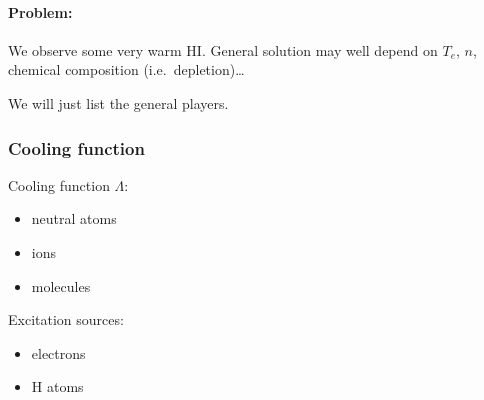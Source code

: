 \documentclass[12pt]{article}
\begin{document}
\paragraph{Problem:}
We observe some very warm HI. General solution may well depend on
$T_{e}$, $n$, chemical composition (i.e.\ depletion)\ldots

We will just list the general players.

\subsubsection{Cooling function}
\begin{minipage}[t]{0.5\textwidth}
Cooling function $\Lambda$:
\begin{itemize}
    \item neutral atoms
    \item ions
    \item molecules
\end{itemize}
\end{minipage}
\begin{minipage}[t]{0.5\textwidth}
Excitation sources:
\begin{itemize}
    \item electrons
    \item H atoms
\end{itemize}
\end{minipage}
\end{document}
